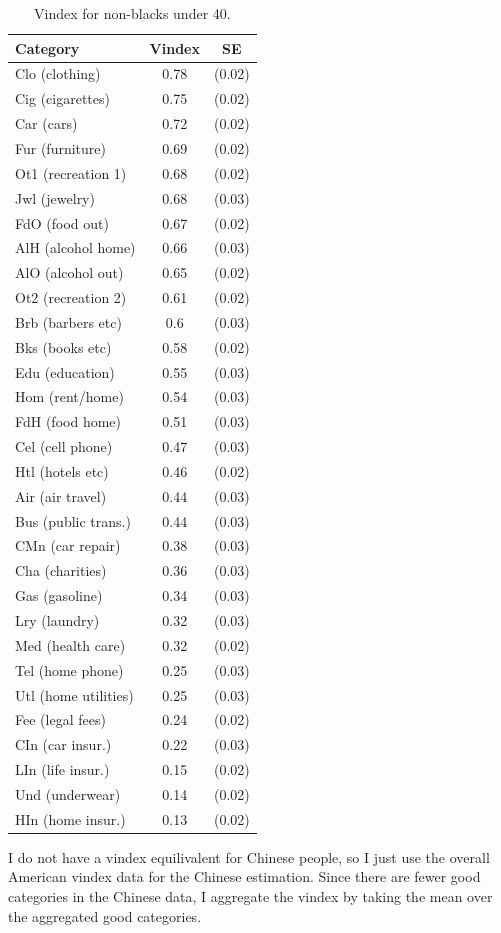 \documentclass[12pt]{article}
\begin{document}
\begin{table}
    \centering
\begin{tabular}{|l|c|c|}
	\hline
	\textbf{Category} & \textbf{Vindex} & \textbf{SE} \\
	\hline
Clo (clothing) & 0.78 & (0.02)\\ 
	\hline
Cig (cigarettes) & 0.75 & (0.02)\\ 
	\hline
Car (cars) & 0.72 & (0.02)\\ 
	\hline
Fur (furniture) & 0.69 & (0.02)\\ 
	\hline
Ot1 (recreation 1) & 0.68 & (0.02)\\ 
	\hline
Jwl (jewelry) & 0.68 & (0.03)\\ 
	\hline
FdO (food out) & 0.67 & (0.02)\\ 
	\hline
AlH (alcohol home) & 0.66 & (0.03)\\ 
	\hline
AlO (alcohol out) & 0.65 & (0.02)\\ 
	\hline
Ot2 (recreation 2) & 0.61 & (0.02)\\ 
	\hline
Brb (barbers etc) & 0.6 & (0.03)\\ 
	\hline
Bks (books etc) & 0.58 & (0.02)\\ 
	\hline
Edu (education) & 0.55 & (0.03)\\ 
	\hline
Hom (rent/home) & 0.54 & (0.03)\\ 
	\hline
FdH (food home) & 0.51 & (0.03)\\ 
	\hline
Cel (cell phone) & 0.47 & (0.03)\\ 
	\hline
Htl (hotels etc) & 0.46 & (0.02)\\ 
	\hline
Air (air travel) & 0.44 & (0.03)\\ 
	\hline
Bus (public trans.) & 0.44 & (0.03)\\ 
	\hline
CMn (car repair) & 0.38 & (0.03)\\ 
	\hline
Cha (charities) & 0.36 & (0.03)\\ 
	\hline
Gas (gasoline) & 0.34 & (0.03)\\ 
	\hline
Lry (laundry) & 0.32 & (0.03)\\ 
	\hline
Med (health care) & 0.32 & (0.02)\\ 
	\hline
Tel (home phone) & 0.25 & (0.03)\\ 
	\hline
Utl (home utilities) & 0.25 & (0.03)\\ 
	\hline
Fee (legal fees) & 0.24 & (0.02)\\ 
	\hline
CIn (car insur.) & 0.22 & (0.03)\\ 
	\hline
LIn (life insur.) & 0.15 & (0.02)\\ 
	\hline
Und (underwear) & 0.14 & (0.02)\\ 
	\hline
HIn (home insur.) & 0.13 & (0.02)\\ 
	\hline
\end{tabular}
\label{tab:vintab}
\caption{Vindex for non-blacks under 40.}
\vspace{-2in}
\end{table}
I do not have a vindex equilivalent for Chinese people, so I just use the overall American vindex data for the Chinese estimation. Since there are fewer good categories in the Chinese data, I aggregate the vindex by taking the mean over the aggregated good categories. 
\end{document}
